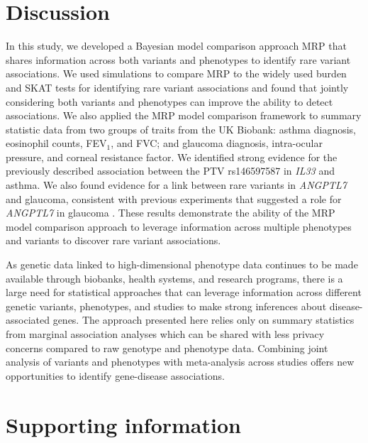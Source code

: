\section*{Discussion}
In this study, we developed a Bayesian model comparison approach MRP that shares information across both variants and phenotypes to identify rare variant associations. We used simulations to compare MRP to the widely used burden and SKAT tests for identifying rare variant associations and found that jointly considering both variants and phenotypes can improve the ability to detect associations. We also applied the MRP model comparison framework to summary statistic data from two groups of traits from the UK Biobank: asthma diagnosis, eosinophil counts, FEV$_1$, and FVC; and glaucoma diagnosis, intra-ocular pressure, and corneal resistance factor. We identified strong evidence for the previously described association between the PTV rs146597587 in \textit{IL33} and asthma\cite{DeBoever179762,10.1371/journal.pgen.1006659}. We also found evidence for a link between rare variants in \textit{ANGPTL7} and glaucoma, consistent with previous experiments that suggested a role for \textit{ANGPTL7} in glaucoma \cite{Comes:2011ex, Kuchtey:2008ek}. These results demonstrate the ability of the MRP model comparison approach to leverage information across multiple phenotypes and variants to discover rare variant associations.

As genetic data linked to high-dimensional phenotype data continues to be made available through biobanks, health systems, and research programs, there is a large need for statistical approaches that can leverage information across different genetic variants, phenotypes, and studies to make strong inferences about disease-associated genes. The approach presented here relies only on summary statistics from marginal association analyses which can be shared with less privacy concerns compared to raw genotype and phenotype data. Combining joint analysis of variants and phenotypes with meta-analysis across studies offers new opportunities to identify gene-disease associations.



\section*{Supporting information}

